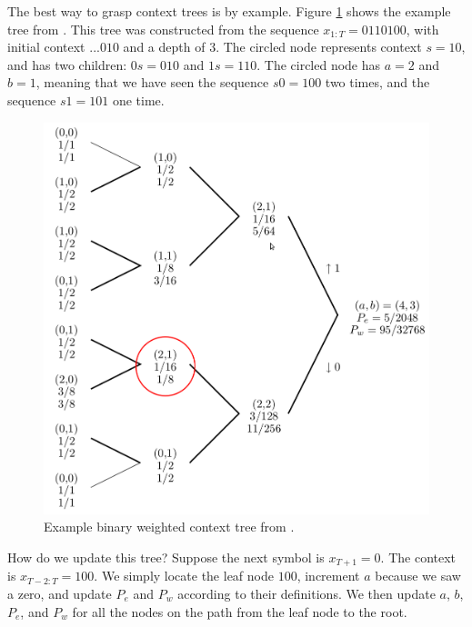 \documentclass[11pt]{scrartcl}
\begin{document}
The best way to grasp context trees is by example. Figure \ref{fig:bin-tree}
shows the example tree from \textcite{eidma}. This tree was constructed from
the sequence $x_{1:T} = 0110100$, with initial context $...010$ and a depth of
3.  The circled node represents context $s = 10$, and has two children: $0s =
010$ and $1s = 110$. The circled node has $a = 2$ and $b = 1$, meaning that we
have seen the sequence $s0 = 100$ two times, and the sequence $s1 = 101$ one
time.

\begin{figure}[h!]
    \centering
    \includegraphics[width=12cm]{eidma-fig-3-2-ed.png}
    \caption{Example binary weighted context tree from \textcite{eidma}.}
    \label{fig:bin-tree}
\end{figure}

How do we update this tree? Suppose the next symbol is $x_{T+1} = 0$. The
context is $x_{T-2:T} = 100$. We simply locate the leaf node $100$, increment
$a$ because we saw a zero, and update $P_e$ and $P_w$ according to their
definitions. We then update $a$, $b$, $P_e$, and $P_w$ for all the nodes on the
path from the leaf node to the root.
\end{document}
